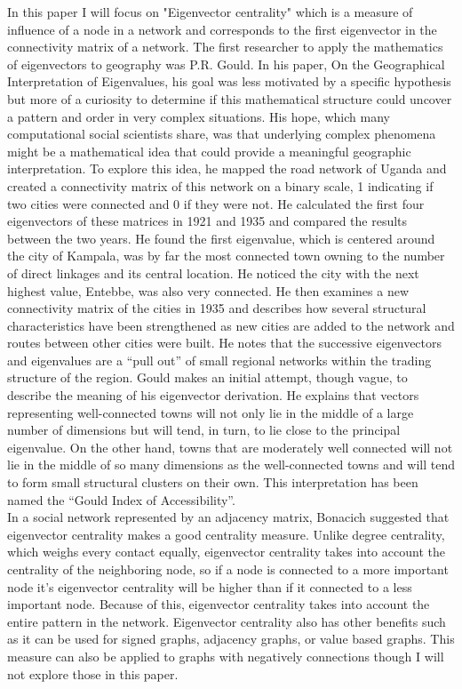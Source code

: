 \documentclass{article}
\theoremstyle{definition}
\theoremstyle{remark}
\begin{document}
In this paper I will focus on "Eigenvector centrality" which is a measure of influence of a node in a network and corresponds to the first eigenvector in the connectivity matrix of a network.  The first researcher to apply the mathematics of eigenvectors to geography was P.R. Gould.  In his paper, On the Geographical Interpretation of Eigenvalues, his goal was less motivated by a specific hypothesis but more of a curiosity to determine if this mathematical structure could uncover a pattern and order in very complex situations.\cite{gould1967geographical}  His hope, which many computational social scientists share, was that underlying complex phenomena might be a mathematical idea that could provide a meaningful geographic interpretation.  To explore this idea, he mapped the road network of Uganda and created a connectivity matrix of this network on a binary scale, 1 indicating if two cities were connected and 0 if they were not.  He calculated the first four eigenvectors of these matrices in 1921 and 1935 and compared the results between the two years.  He found the first eigenvalue, which is centered around the city of Kampala, was by far the most connected town owning to the number of direct linkages and its central location.  He noticed the city with the next highest value, Entebbe, was also very connected.  He then examines a new connectivity matrix of the cities in 1935 and describes how several structural characteristics have been strengthened as new cities are added to the network and routes between other cities were built.  He notes that the successive eigenvectors and eigenvalues are a “pull out” of small regional networks within the trading structure of the region.  Gould makes an initial attempt, though vague, to describe the meaning of his eigenvector derivation.  He explains that vectors representing well-connected towns will not only lie in the middle of a large number of dimensions but will tend, in turn, to lie close to the principal eigenvalue.  On the other hand, towns that are moderately well connected will not lie in the middle of so many dimensions as the well-connected towns and will tend to form small structural clusters on their own.  This interpretation has been named the “Gould Index of Accessibility”.\\

In a social network represented by an adjacency matrix, Bonacich suggested that eigenvector centrality makes a good centrality measure\cite{bonacich2007some}.  Unlike degree centrality, which weighs every contact equally, eigenvector centrality takes into account the centrality of the neighboring node, so if a node is connected to a more important node it's eigenvector centrality will be higher than if it connected to a less important node.  Because of this, eigenvector centrality takes into account the entire pattern in the network.  Eigenvector centrality also has other benefits such as it can be used for signed graphs, adjacency graphs, or value based graphs.  This measure can also be applied to graphs with negatively connections though I will not explore those in this paper. \\
\end{document}
